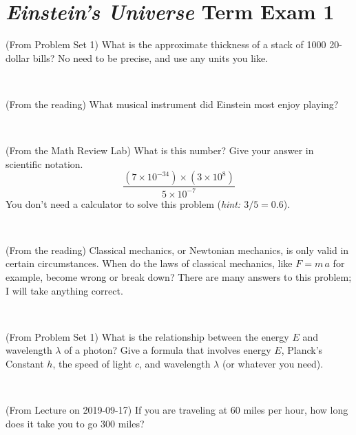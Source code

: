 \documentclass[12pt, letterpaper]{article}
\begin{document}
\section*{\textsl{Einstein's Universe} Term Exam 1}
\setcounter{problem}{1}


\begin{problem} (From Problem Set 1)
What is the approximate thickness of a stack of 1000 20-dollar bills?
No need to be precise, and use any units you like.
\end{problem}


\vfill ~

\begin{problem} (From the reading)
What musical instrument did Einstein most enjoy playing?
\end{problem}


\vfill ~

\begin{problem} (From the Math Review Lab)
What is this number? Give your answer in scientific notation.
$$
\frac{(7\times10^{-34})\times(3\times10^8)}{5\times10^{-7}}
$$
You don't need a calculator to solve this problem (\textit{hint: $3/5=0.6$}).
\end{problem}


\vfill ~

\begin{problem} (From the reading)
Classical mechanics, or Newtonian mechanics, is only valid in certain
circumstances. When do the laws of classical mechanics, like $F =
m\,a$ for example, become wrong or break down? There are many answers
to this problem; I will take anything correct.
\end{problem}


\vfill ~


\clearpage


\begin{problem} (From Problem Set 1)
What is the relationship between the energy $E$ and wavelength
$\lambda$ of a photon? Give a formula that involves energy $E$,
Planck's Constant $h$, the speed of light $c$, and wavelength
$\lambda$ (or whatever you need).
\end{problem}

\vfill ~

\begin{problem} (From Lecture on 2019-09-17)
If you are traveling at 60 miles per hour, how long does
it take you to go 300 miles?
\end{problem}


\vfill ~
\end{document}
